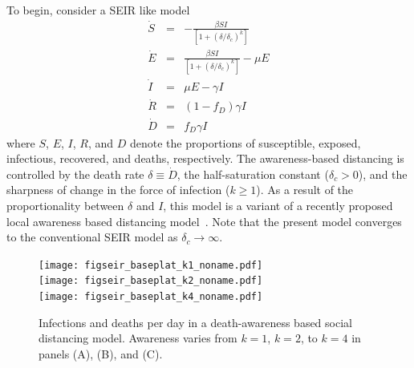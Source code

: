 To begin, consider a SEIR like model
\begin{eqnarray}
\dot{S} &=& -\frac{\beta SI}{\left[1+\left(\delta/\delta_c\right)^{k}\right]}\\
\dot{E} &=& \frac{\beta SI}{\left[1+\left(\delta/\delta_c\right)^{k}\right]}-\mu E\\
\dot{I} &=& \mu E-\gamma I \\
\dot{R} &=& (1-f_D)\gamma I\\
\dot{D} &=& f_D\gamma I
\end{eqnarray}
where $S$, $E$, $I$, $R$, and $D$ denote the proportions of
susceptible, exposed, infectious, recovered, and deaths, respectively.
The awareness-based distancing is controlled by 
the death rate $\delta\equiv \dot{D}$,
the half-saturation constant ($\delta_c>0$), and
the sharpness of change in the force of infection ($k\geq 1$).
As a result of the proportionality
between $\delta$ and $I$, this model is a variant of a recently proposed
local awareness based distancing model~\citep{eksin2019systematic}.
Note that the present
model converges to the conventional SEIR model as $\delta_c\rightarrow \infty$.
\begin{figure}[t!]
\begin{center}
\texttt{[image: figseir\_baseplat\_k1\_noname.pdf]}\\
\texttt{[image: figseir\_baseplat\_k2\_noname.pdf]}\\
\texttt{[image: figseir\_baseplat\_k4\_noname.pdf]}
\caption{Infections and deaths per day in a death-awareness based
social distancing model. Awareness varies from $k=1$, $k=2$, to $k=4$ 
in panels (A), (B), and (C).
\label{fig.ID_day}}
\end{center}
\end{figure}

